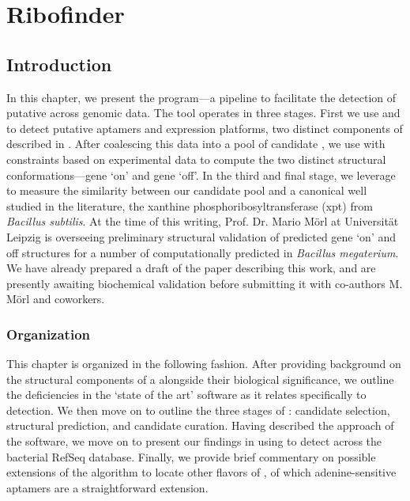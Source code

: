 
\newcommand{\fnaRetrievalTime}{\formatdate{25}{11}{2014} at \formattime{9}{14}{0}}

\chapter{Ribofinder}
\label{ch:rfinder}


\section{Introduction}
\label{sec:rfinder:intro}

In this chapter, we present the \rfinder program---a pipeline to facilitate the
detection of putative \grbs across genomic data. The \rfinder
tool operates in three stages. First we use \infernal
\citep{infernal,nawrocki:2013hk} and \tthp \citep{ermolaeva:2000cl} to detect
putative aptamers and expression platforms, two distinct components of
\rbs described in . After coalescing
this data into a pool of candidate \rbs, we use \rfold \citep{lorenz.amb11}
with constraints based on experimental data to compute the two distinct structural
conformations---gene `on' and gene `off'. In the third and final stage, we
leverage \foldalign \citep{gorodkin:1997tr,havgaard:2007ca} to measure the similarity between our
candidate pool and a
canonical \grb well studied in the literature, the
xanthine phosphoribosyltransferase (xpt) \grb from {\em Bacillus subtilis}. At the
time of this writing, Prof. Dr. Mario
M\"orl at Universit\"at Leipzig is overseeing preliminary structural
validation of predicted gene `on' and off structures for a number of
computationally predicted \grbs in {\em Bacillus megaterium}. We have already
prepared a draft of the paper describing this work, and are presently awaiting
biochemical validation before submitting it with co-authors M. M\"orl and
coworkers.

\subsection{Organization}
\label{subsec:rfinder:org}

This chapter is organized in the following fashion. After providing background
on the structural components of a \rb alongside their biological
significance, we outline the deficiencies in the `state of the art' software
as it relates specifically to \rb detection. We then move on to outline
the three stages of \rfinder: candidate selection, structural prediction, and
candidate curation. Having described the approach of the software, we move on
to present our findings in using \rfinder to detect \grbs across
the bacterial RefSeq database. Finally, we provide brief commentary on possible
extensions of the algorithm to locate other flavors of \rbs, of which
adenine-sensitive aptamers are a straightforward extension.

